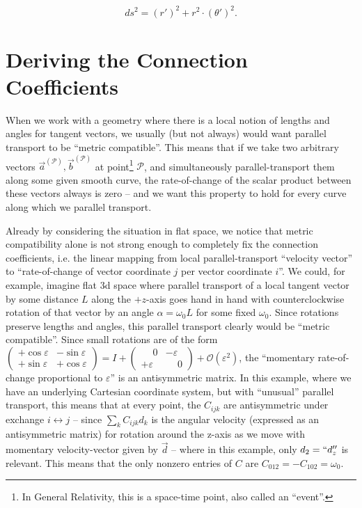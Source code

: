 \documentclass[twocolumn]{article}
\begin{document}
\begin{equation}
  ds^2 = (r')^2 + r^2\cdot(\theta')^2.
\end{equation}

\section{Deriving the Connection Coefficients}\label{app:Christoffel}

When we work with a geometry where there is a local notion of lengths
and angles for tangent vectors, we usually (but not always) would
want parallel transport to be ``metric compatible''. This means that
if we take two arbitrary vectors
$\vec a^{({\mathcal P})}, \vec b^{({\mathcal P})}$ at
point\footnote{In General Relativity, this is a space-time point, also
  called an ``event''.} $\mathcal P$, and simultaneously
parallel-transport them along some given smooth curve, the rate-of-change
of the scalar product between these vectors always is zero -- and we
want this property to hold for every curve along which we parallel
transport.

Already by considering the situation in flat space, we notice that
metric compatibility alone is not strong enough to completely fix the
connection coefficients, i.e. the linear mapping from local
parallel-transport ``velocity vector'' to ``rate-of-change of vector
coordinate $j$ per vector coordinate $i$''. We could, for example,
imagine flat 3d space where parallel transport of a local tangent
vector by some distance $L$ along the $+z$-axis goes hand in hand
with counterclockwise rotation of that vector by an angle
$\alpha=\omega_0L$ for some fixed $\omega_0$. Since rotations preserve
lengths and angles, this parallel transport clearly would be ``metric
compatible''.
Since small rotations are of the form $\left(\begin{array}{cc}+\cos\varepsilon&-\sin\varepsilon\\+\sin\varepsilon&+\cos\varepsilon\end{array}\right)=I+\left(\begin{array}{cc}\phantom+0&-\varepsilon\\+\varepsilon&\phantom+0\end{array}\right)+{\mathcal O}(\varepsilon^2)$,
the ``momentary rate-of-change proportional to $\varepsilon$'' is an antisymmetric matrix.
In this example, where we have an underlying Cartesian coordinate system,
but with ``unusual'' parallel transport, this means that at every point, the $C_{ijk}$
are antisymmetric under exchange $i\leftrightarrow j$ -- since $\sum_k C_{ijk} d_k$ is
the angular velocity (expressed as an antisymmetric matrix) for rotation around the
z-axis as we move with momentary velocity-vector given by $\vec d$ -- where in this
example, only $d_2=``d_z''$ is relevant. This means that the only nonzero entries
of $C$ are $C_{012}=-C_{102}=\omega_0$.
\end{document}

